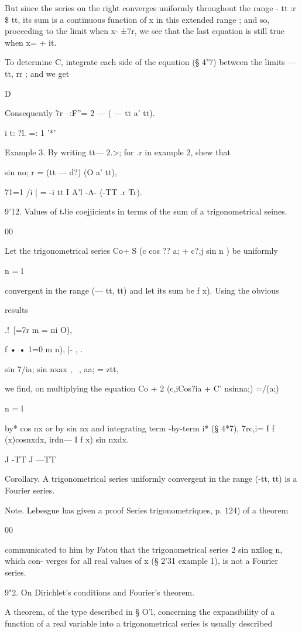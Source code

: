 But since the series on the right converges uniformly throughout the
range - tt :r \$ tt, its sum is a continuous function of x in this
extended range ; and so, proceeding to the limit when x- ±7r, we see
that the last equation is still true when x= + it.

To determine C, integrate each side of the equation (§ 4"7) between
the limits — tt, rr ; and we get

D

Consequently 7r --:F''= 2 — ( — tt a' tt).

i t: ?l. =: 1 '*'

Example 3. By writing tt— 2.>; for .r in example 2, shew that

  sin no; r = (tt — d?) (O a' tt),

71=1 /i | = -i tt I A'l -A- (-TT .r Tr).

9'12. Values of tJie coejjicients in terms of the sum of a
trigonometrical seines.

00

Let the trigonometrical series Co+ S (c cos ?? a; + c?,j sin n ) be
uniformly

n = l

convergent in the range (— tt, tt) and let its sum be f x). Using the
obvious

results

.!\ [=7r m = ni O),

f • • 1=0 m n), |- , .

sin 7/ia; sin nxax , \ , aa; = ztt,

we find, on multiplying the equation Co + 2 (c,iCos?ia + C' nsinna;)
=/(a;)

n = l

by* cos nx or by sin nx and integrating term -by-term i* (§ 4*7),
7rc,i= I f (x)cosnxdx, irdn— I f x) sin nxdx.

J -TT J —TT

Corollary. A trigonometrical series uniformly convergent in the range
(-tt, tt) is a Fourier series.

Note. Lebesgue has given a proof Series trigonometriques, p. 124) of a
theorem

00

communicated to him by Fatou that the trigonometrical series 2 sin
nxllog n, which con- verges for all real values of x (§ 2'31 example
1), is not a Fourier series.

9"2. On Dirichlet's conditions and Fourier's theorem.

A theorem, of the type described in § O'l, concerning the
expansibility of a function of a real variable into a trigonometrical
series is usually described

